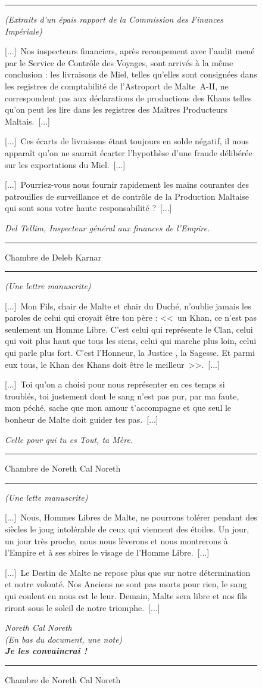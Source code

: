 \documentclass{article}
\newcommand{\newcharacter}{\clearpage\setcounter{figure}{0}}
\newcommand{\indice}[4]{
    \begin{figure}[H]
        \begin{center}
            \rule{0.5\textwidth}{1pt}
        \end{center}
        \begin{framed}
            \begin{samepage}
                \textit{#1}
                \nopagebreak

                #2

                \nopagebreak

                \hfill\textit{#3}
            \end{samepage}
        \end{framed}
        \caption{#4}
        \begin{center}
            \rule{0.5\textwidth}{1pt}
        \end{center}
    \end{figure}
}
\begin{document}
\indice
{(Extraits d’un épais rapport de la Commission des Finances Impériale)}
{[...]~Nos inspecteurs financiers, après recoupement avec l’audit mené par le
Service de Contrôle des Voyages, sont arrivés à la même conclusion : les
livraisons de Miel, telles qu’elles sont consignées dans les registres de
comptabilité de l’Astroport de Malte~A-II, ne correspondent pas aux
déclarations de productions des Khans telles qu’on peut les lire dans les
registres des Maîtres Producteurs Maltais.~[...]

\nobreak

[...]~Ces écarts de livraisons étant toujours en solde négatif, il nous
apparaît qu’on ne saurait écarter l’hypothèse d’une fraude délibérée sur les
exportations du Miel.~[...]

\nobreak

[...]~Pourriez-vous nous fournir rapidement les mains courantes des patrouilles
de surveillance et de contrôle de la Production Maltaise qui sont sous votre
haute responsabilité ?~[...]}
{Del Tellim, Inspecteur général aux finances de l’Empire.}
{Chambre de Deleb Karnar}

\newcharacter

\indice
{(Une lettre manuscrite)}
{[...]~Mon Fils, chair de Malte et chair du Duché, n’oublie jamais les paroles
de celui qui croyait être ton père : <<~un Khan, ce n’est pas seulement un
Homme Libre. C’est celui qui représente le Clan, celui qui voit plus haut que
tous les siens, celui qui marche plus loin, celui qui parle plus fort. C’est
l’Honneur, la Justice , la Sagesse. Et parmi eux tous, le Khan des Khans doit
être le meilleur~>>.~[...]

\nobreak

[...]~Toi qu’on a choisi pour nous représenter en ces temps si troublés, toi
justement dont le sang n’est pas pur, par ma faute, mon péché, sache que mon
amour t’accompagne et que seul le bonheur de Malte doit guider tes
pas.~[...]}
{Celle pour qui tu es Tout, ta Mère.}
{Chambre de Noreth Cal Noreth}

\indice
{(Une lette manuscrite)}
{[...]~Nous, Hommes Libres de Malte, ne pourrons tolérer pendant des siècles le
joug intolérable de ceux qui viennent des étoiles. Un jour, un jour très
proche, nous nous lèverons et nous montrerons à l’Empire et à ses sbires le
visage de l’Homme Libre.~[...]

\nobreak

[...]~Le Destin de Malte ne repose plus que sur notre détermination et notre
volonté. Nos Anciens ne sont pas morts pour rien, le sang qui coulent en nous
est le leur. Demain, Malte sera libre et nos fils riront sous le soleil de
notre triomphe.~[...]}
{Noreth Cal Noreth\\
(En bas du document, une note)\\
\textbf{Je les convaincrai !}}
{Chambre de Noreth Cal Noreth}
\end{document}
